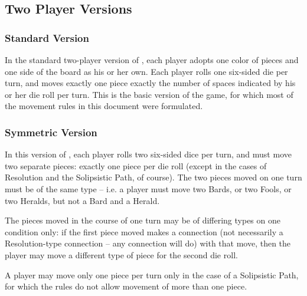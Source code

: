 %

\subsection{Two Player Versions}\label{2player}

\subsubsection{Standard Version}\label{2player_std}
  In the standard two-player version of \know, each player adopts one color of pieces and one
  side of the board as his or her own.  Each player rolls one six-sided die per turn, and moves
  exactly one piece exactly the number of spaces indicated by his or her die roll per turn.  This
  is the basic version of the game, for which most of the movement rules in this document
  were formulated.

\subsubsection{Symmetric Version}\label{2player_sym}
  In this version of \know, each player rolls two six-sided dice per turn, and must
  move two separate pieces: exactly one piece per die roll (except in the cases of
  Resolution and the Solipsistic Path, of course).  The two pieces moved on one
  turn must be of the same type -- i.e. a player must move two Bards, or two Fools,
  or two Heralds, but not a Bard and a Herald.

  The pieces moved in the course of one turn may be of differing types on one
  condition only: if the first piece moved makes a connection (not necessarily a
  Resolution-type connection -- any connection will do) with that move, then
  the player may move a different type of piece for the second die roll.

  A player may move only one piece per turn only in the case of a Solipsistic Path,
  for which the rules do not allow movement of more than one piece.

